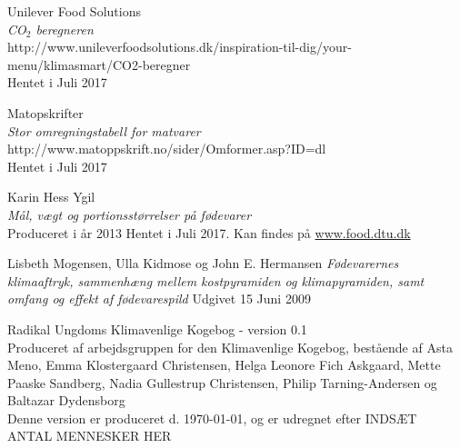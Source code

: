 \documentclass[11pt, a4paper]{article}
\newcommand{\coo}{CO$_2$ }
\begin{document}
\begin{thebibliography}{9}
	Unilever Food Solutions\\
	\textit{\coo beregneren}\\
	http://www.unileverfoodsolutions.dk/inspiration-til-dig/your-menu/klimasmart/CO2-beregner\\
	Hentet i Juli 2017
	
	Matopskrifter\\
	\textit{Stor omregningstabell for matvarer}\\
	http://www.matoppskrift.no/sider/Omformer.asp?ID=dl\\
	Hentet i Juli 2017
	
 Karin Hess Ygil\\
	\textit{Mål, vægt og portionsstørrelser på fødevarer}\\
	Produceret i år 2013
	Hentet i Juli 2017. Kan findes på \url{www.food.dtu.dk}
	
	Lisbeth Mogensen, Ulla Kidmose og John E. Hermansen
	\textit{Fødevarernes klimaaftryk,
		sammenhæng mellem kostpyramiden og klimapyramiden,
		samt omfang og effekt af fødevarespild}
	Udgivet 15 Juni 2009
	
\end{thebibliography}
	\newpage
	\centering Radikal Ungdoms Klimavenlige Kogebog - version 0.1\\
	Produceret af arbejdsgruppen for den Klimavenlige Kogebog, bestående af Asta Meno, Emma Klostergaard Christensen, Helga Leonore Fich Askgaard, Mette Paaske Sandberg, Nadia Gullestrup Christensen, Philip Tarning-Andersen og Baltazar Dydensborg\\
	Denne version er produceret d. \today, og er udregnet efter INDSÆT ANTAL MENNESKER HER
\end{document}
